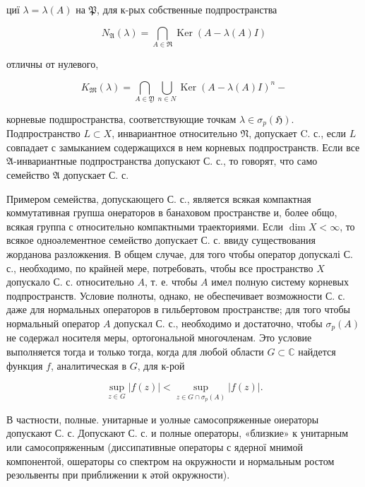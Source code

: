 \documentclass[10pt]{article}
\begin{document}
циї $\lambda=\lambda(A)$ на $\mathfrak{P}$, для к-рых собственные подпространства



\[

N_{\mathfrak{A}}(\lambda)=\bigcap_{A \in \mathfrak{R}} \operatorname{Ker}(A-\lambda(A) I)

\]



отличны от нулевого,



\[

K_{\mathfrak{M}}(\lambda)=\bigcap_{A \in \mathfrak{Y}} \bigcup_{n \in N} \operatorname{Ker}(A-\lambda(A) I)^{n}-

\]



корневые подшространства, соответствующие точкам $\lambda \in \sigma_{p}(\mathfrak{H})$. Подпространство $L \subset X$, инвариантное относительно $\mathfrak{N}$, допускает C. с., если $L$ совпадает с замыканием содержащихся в нем корневых подпространств. Если все $\mathfrak{A}$-инвариантные подпространства допускают С. с., то говорят, что само семейство $\mathfrak{A}$ допускает С. с.



Примером семейства, допускающего С. с., является всякая компактная коммутативная групша онераторов в банаховом пространстве и, более общо, всякая группа с относительно компактными траекториями. Если $\operatorname{dim} X<\infty$, то всякое одноәлементное семейство допускает С. с. ввиду существования жорданова разложкения. В общем случае, для того чтобы оператор допускалі С. с., необходимо, по крайней мере, потребовать, чтобы все пространство $X$ допускало С. с. относительно $A$, т. е. чтобы $A$ имел полную систему корневых подпространств. Условие полноты, однако, не обеспечивает возможности С. с. даже для нормальных операторов в гильбертовом пространстве; для того чтобы нормальный оператор $A$ допускал С. с., необходимо и достаточно, чтобы $\sigma_{p}(A)$ не содержал носителя меры, ортогональной многочленам. Это условие выполняется тогда и только тогда, когда для любой области $G \subset \mathbb{C}$ найдется функция $f$, аналитическая в $G$, для к-рой



\[

\sup _{z \in G}|f(z)|<\sup _{z \in G \cap \sigma_{p}(A)}|f(z)| .

\]



В частности, полные. унитарные и уолные самосопряженные оиераторы допускают С. с. Допускают С. с. и полные операторы, «близкие» к унитарным или самосопряженным (диссипативные операторы с ядерної мнимой компонентой, ошераторы со спектром на окружности и нормальным ростом резольвенты при приближении к әтой окружности).
\end{document}
